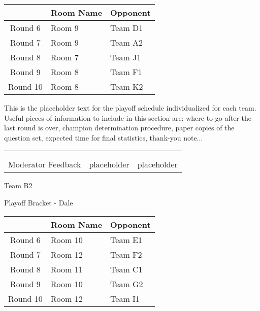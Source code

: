 \documentclass{article}%
\begin{document}
\vspace*{4pt}%
%
\begin{tabularx}{\textwidth}{|c|Y|Y|}%
\hline%
&Room Name&Opponent\\%
\hline%
Round 6&Room 9&Team D1\\%
Round 7&Room 9&Team A2\\%
Round 8&Room 7&Team J1\\%
Round 9&Room 8&Team F1\\%
Round 10&Room 8&Team K2\\%
\hline%
\end{tabularx}%
\vspace*{30pt}%
\linebreak%
This is the placeholder text for the playoff schedule individualized for each team. Useful pieces of information to include in this section are: where to go after the last round is over, champion determination procedure, paper copies of the question set, expected time for final statistics, thank{-}you note...%
\vspace*{30pt}%
\newline%
%
\begin{tabularx}{\textwidth}{YYY}%
  &  &  \\%
\\%
Moderator Feedback&placeholder&placeholder\\%
\end{tabularx}%
\newpage%
\begin{center}%
\begin{Huge}%
Team B2%
\end{Huge}%
\vspace*{12pt}%
\linebreak%
\begin{Large}%
Playoff Bracket {-} Dale%
\end{Large}%
\end{center}%
\vspace*{4pt}%
%
\begin{tabularx}{\textwidth}{|c|Y|Y|}%
\hline%
&Room Name&Opponent\\%
\hline%
Round 6&Room 10&Team E1\\%
Round 7&Room 12&Team F2\\%
Round 8&Room 11&Team C1\\%
Round 9&Room 10&Team G2\\%
Round 10&Room 12&Team I1\\%
\hline%
\end{tabularx}%
\end{document}
